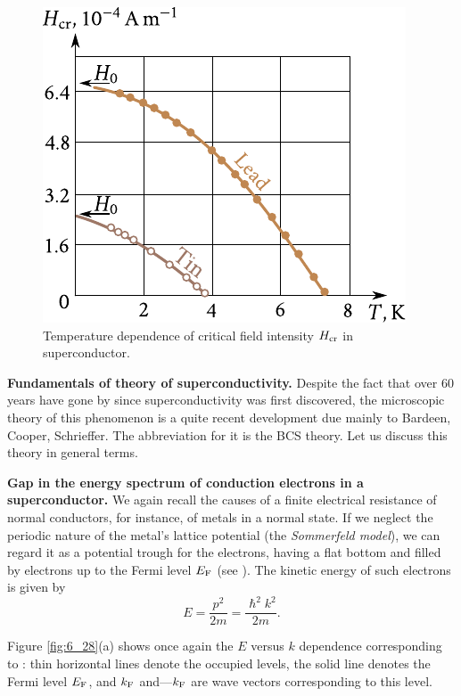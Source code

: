\begin{figure}[t]
	\begin{center}
		\includegraphics[scale=1]{figures/ch_06/fig_6_27.pdf}
		\caption[]{Temperature dependence of critical field intensity $H_{\text{cr}}$ in superconductor.}
		\label{fig:6_27}
	\end{center}
	\vspace{-0.7cm}
\end{figure}

\textbf{Fundamentals of theory of superconductivity.} Despite the fact that over $60$ years have gone by since superconductivity was first discovered, the microscopic theory of this phenomenon is a quite recent development due mainly to Bardeen, Cooper, Schrieffer. The abbreviation for it is the BCS theory. Let us discuss this theory in general terms.

\textbf{Gap in the energy spectrum of conduction electrons in a superconductor.} We again recall the causes of a finite electrical resistance of normal conductors, for instance, of metals in a normal state. If we neglect the periodic nature of the metal's lattice potential (the \textit{Sommerfeld model}), we can regard it as a potential trough for the electrons, having a flat bottom and filled by electrons up to the Fermi level $E_{\text{F}}$ (see ). The kinetic energy of such electrons is given by 
\begin{equation*}
	E = \frac{p^2}{2m} = \frac{\hslash^2 k^2}{2m}.
\end{equation*}

Figure \ref{fig:6_28}(a) shows once again the $E$ versus $k$ dependence corresponding to : thin horizontal lines denote the occupied levels, the solid line denotes the Fermi level $E_{\text{F}}$, and $k_{\text{F}}$ and---$k_{\text{F}}$ are wave vectors corresponding to this level.

